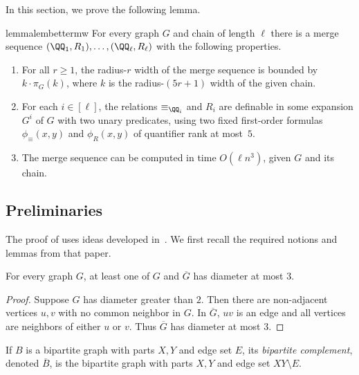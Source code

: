 In this section, we prove the following lemma.

\begin{restatable}{lemma}{lembettermw}\label{lem:better-mw}
For every graph $G$ and chain of length $\ell$ there is a merge sequence $(\QQ_1, R_1), \ldots, (\QQ_\ell, R_\ell)$ with the following properties.
    \begin{enumerate}
        \item For all $r\ge 1$,  the radius-$r$ width of the merge sequence is bounded by $k\cdot \pi_G(k)$, where $k$ is the radius-$(5r+1)$ width of the given chain.
        \item  For each $i\in [\ell]$, the relations $\equiv_{\QQ_i}$ and $R_i$ are definable in some expansion $G^i$ of $G$ with two unary predicates, using two fixed first-order formulas $\phi_\equiv(x,y)$ and $\phi_R(x,y)$ of quantifier rank at most~$5$.
        \item The merge sequence can be computed in time $O(\ell n^3)$, given $G$ and its chain.
    \end{enumerate}
\end{restatable}

\subsection{Preliminaries}

The proof of  uses ideas developed in~\cite{drabik2026variants}. We first recall the required notions and lemmas from that paper.

\begin{lemma}[folklore]\label{lem:diamComplement}
    For every graph $G$, at least one of $G$ and $\overline{G}$ has diameter at most $3$.
\end{lemma}
\begin{proof}
Suppose $G$ has diameter greater than $2$. Then there are non-adjacent vertices $u,v$ with no common neighbor in $G$.
In $\overline G$, $uv$ is an edge and all vertices are neighbors of either $u$ or $v$.
Thus $\overline G$ has diameter at most $3$.
\end{proof}

If $B$
is a bipartite graph with parts $X,Y$ and edge set $E$,
its \emph{bipartite complement}, denoted $\overline B$,
is the bipartite graph with parts $X,Y$ and edge set $XY\setminus E$.

